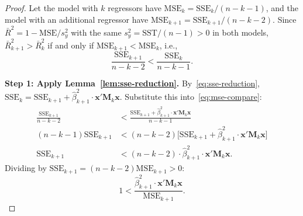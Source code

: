 \documentclass[14pt]{extarticle}
\theoremstyle{plain}
\theoremstyle{definition}
\theoremstyle{remark}
\newcommand{\SST}{\mathrm{SST}}
\newcommand{\SSE}{\mathrm{SSE}}
\newcommand{\MSE}{\mathrm{MSE}}
\newcommand{\bx}{\mathbf{x}}
\newcommand{\bM}{\mathbf{M}}
\begin{document}
\begin{proof}
Let the model with $k$ regressors have $\MSE_k = \SSE_k/(n-k-1)$, and the model with an additional regressor have $\MSE_{k+1} = \SSE_{k+1}/(n-k-2)$. Since $\bar{R}^2 = 1 - \MSE/s_y^2$ with the same $s_y^2 = \SST/(n-1) > 0$ in both models, $\bar{R}^2_{k+1} > \bar{R}^2_k$ if and only if $\MSE_{k+1} < \MSE_k$, i.e.,
\begin{equation}\label{eq:mse-compare}
\frac{\SSE_{k+1}}{n-k-2} < \frac{\SSE_k}{n-k-1}.
\end{equation}

\textbf{Step 1: Apply Lemma~\ref{lem:sse-reduction}.}
By~\eqref{eq:sse-reduction}, $\SSE_k = \SSE_{k+1} + \hat{\beta}_{k+1}^2\cdot\bx'\bM_k\bx$. Substitute this into~\eqref{eq:mse-compare}:
\begin{align*}
\frac{\SSE_{k+1}}{n-k-2} &< \frac{\SSE_{k+1} + \hat{\beta}_{k+1}^2\cdot\bx'\bM_k\bx}{n-k-1}\\
(n-k-1)\SSE_{k+1} &< (n-k-2)\bigl[\SSE_{k+1} + \hat{\beta}_{k+1}^2\cdot\bx'\bM_k\bx\bigr]\\
\SSE_{k+1} &< (n-k-2)\cdot\hat{\beta}_{k+1}^2\cdot\bx'\bM_k\bx.
\end{align*}
Dividing by $\SSE_{k+1} = (n-k-2)\MSE_{k+1} > 0$:
\begin{equation}\label{eq:mse-simplified}
1 < \frac{\hat{\beta}_{k+1}^2\cdot\bx'\bM_k\bx}{\MSE_{k+1}}.
\end{equation}


\end{proof}
\end{document}
